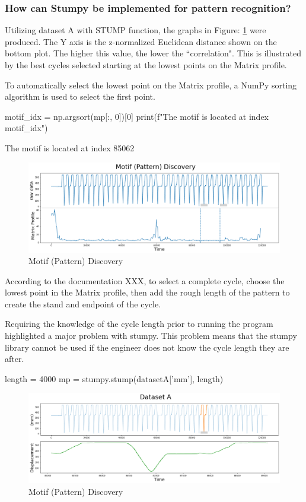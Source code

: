 \subsubsection{How can Stumpy be implemented for pattern recognition?}
Utilizing dataset A with STUMP function, the graphs in Figure: \ref{Motif} were produced.
The Y axis is the z-normalized Euclidean distance shown on the bottom plot. The higher this value, the lower the ``correlation". This is illustrated by the best cycles selected starting at the lowest points on the Matrix profile.

To automatically select the lowest point on the Matrix profile, a NumPy sorting algorithm is used to select the first point.

\begin{python}
motif_idx = np.argsort(mp[:, 0])[0]
print(f"The motif is located at index {motif_idx}")
\end{python}
The motif is located at index 85062

\begin{figure}
\centering
\includegraphics[scale=0.40]{images/Motif (Pattern) Discovery.png}
\caption{Motif (Pattern) Discovery}
\label{Motif}
\end{figure}
According to the documentation XXX, to select a complete cycle, choose the lowest point in the Matrix profile, then add the rough length of the pattern to create the stand and endpoint of the cycle.

Requiring the knowledge of the cycle length prior to running the program highlighted a major problem with stumpy. This problem means that the stumpy library cannot be used if the engineer does not know the cycle length they are after. 
\begin{python}
length = 4000
mp = stumpy.stump(datasetA['mm'], length)

\end{python}

\begin{figure}
\centering
\includegraphics[scale=0.40]{images/DatasetA.png}
\caption{Motif (Pattern) Discovery}
\label{Stumpy Cycle selected}
\end{figure}

